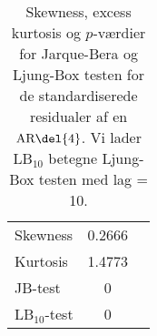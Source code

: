 \begin{table}
\center
\begin{tabular}{lcc} \toprule
Skewness & 0.2666 \\
Kurtosis & 1.4773 \\
JB-test & 0 \\ 
LB$_{10}$-test & 0 \\ \bottomrule
\end{tabular}
\caption{Skewness, excess kurtosis og \(p\)-værdier for Jarque-Bera og Ljung-Box testen for de standardiserede residualer af en \(\text{AR} \del{4}\). Vi lader LB$_{10}$ betegne Ljung-Box testen med lag = 10. } \label{tab:test_ar}
\end{table}